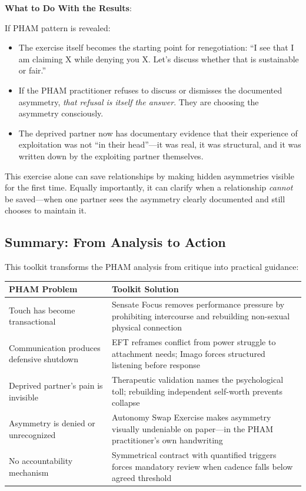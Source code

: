 \documentclass[12pt,openany]{book}
\numberwithin{equation}{chapter}
\begin{document}
\textbf{What to Do With the Results}:

If PHAM pattern is revealed:
\begin{itemize}
    \item The exercise itself becomes the starting point for renegotiation: ``I see that I am claiming X while denying you X. Let's discuss whether that is sustainable or fair.''
    \item If the PHAM practitioner refuses to discuss or dismisses the documented asymmetry, \textit{that refusal is itself the answer}. They are choosing the asymmetry consciously.
    \item The deprived partner now has documentary evidence that their experience of exploitation was not ``in their head''---it was real, it was structural, and it was written down by the exploiting partner themselves.
\end{itemize}

This exercise alone can save relationships by making hidden asymmetries visible for the first time. Equally importantly, it can clarify when a relationship \textit{cannot} be saved---when one partner sees the asymmetry clearly documented and still chooses to maintain it.

\subsection{Summary: From Analysis to Action}

This toolkit transforms the PHAM analysis from critique into practical guidance:

\begin{center}
\begin{tabular}{|p{2.2in}|p{3.3in}|}
\hline
\textbf{PHAM Problem} & \textbf{Toolkit Solution} \\
\hline
Touch has become transactional & Sensate Focus removes performance pressure by prohibiting intercourse and rebuilding non-sexual physical connection \\
\hline
Communication produces defensive shutdown & EFT reframes conflict from power struggle to attachment needs; Imago forces structured listening before response \\
\hline
Deprived partner's pain is invisible & Therapeutic validation names the psychological toll; rebuilding independent self-worth prevents collapse \\
\hline
Asymmetry is denied or unrecognized & Autonomy Swap Exercise makes asymmetry visually undeniable on paper---in the PHAM practitioner's own handwriting \\
\hline
No accountability mechanism & Symmetrical contract with quantified triggers forces mandatory review when cadence falls below agreed threshold \\
\hline
\end{tabular}
\end{center}
\end{document}
